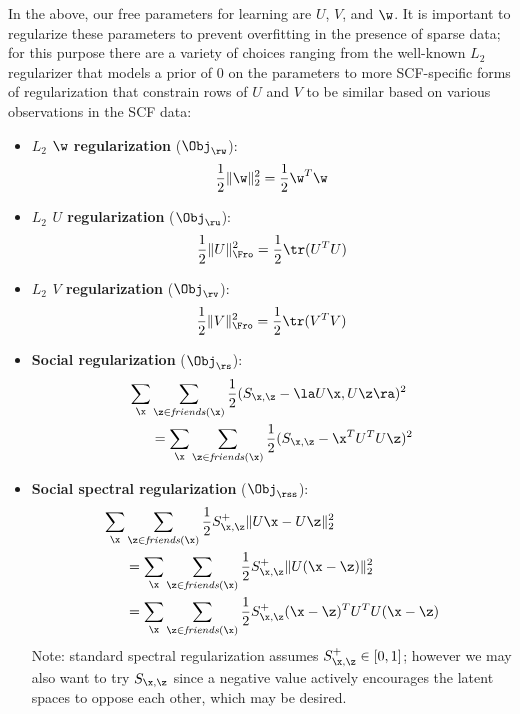 In the above, our free parameters for learning are $U$, $V$, and $\w$.
It is important to regularize these parameters to prevent overfitting in
the presence of sparse data;
for this purpose there are a variety of choices ranging from the well-known
$L_2$ regularizer that models a prior of $0$ on the parameters
to more SCF-specific forms of regularization that
constrain rows of $U$ and $V$ to be similar based on various observations
in the SCF data:
\begin{itemize}
\item {\bf $L_2$ $\w$ regularization} ($\Obj_\rw$):
\begin{align}
\frac{1}{2} \| \w \|_2^2 = \frac{1}{2} \w^T \w
\end{align}
\item {\bf $L_2$ $U$ regularization} ($\Obj_\ru$):
\begin{align}
\frac{1}{2} \| U \|_\Fro^2 = \frac{1}{2} \tr(U^T U)
\end{align}
\item {\bf $L_2$ $V$ regularization} ($\Obj_\rv$):
\begin{align}
\frac{1}{2} \| V \|_\Fro^2 = \frac{1}{2} \tr(V^T V)
\end{align}
\item {\bf Social regularization} ($\Obj_\rs$):
\begin{align}
\sum_{\x} & \sum_{\z \in \mathit{friends}(\x)} \frac{1}{2} (S_{\x,\z} - \la U\x, U\z \ra)^2 \nonumber \\
& = \sum_{\x} \sum_{\z \in \mathit{friends}(\x)} \frac{1}{2} (S_{\x,\z} - \x^T U^T U \z)^2
\end{align}
\item {\bf Social spectral regularization} ($\Obj_\rss$):
\begin{align}
\sum_{\x} & \sum_{\z \in \mathit{friends}(\x)} \frac{1}{2} S^+_{\x,\z} \| U\x - U\z \|_2^2 \nonumber \\
& = \sum_{\x} \sum_{\z \in \mathit{friends}(\x)} \frac{1}{2} S^+_{\x,\z} \| U (\x - \z) \|_2^2 \nonumber \\
& = \sum_{\x} \sum_{\z \in \mathit{friends}(\x)} \frac{1}{2} S^+_{\x,\z} (\x - \z)^T U^T U (\x - \z)
\end{align}
\subfive Note: standard spectral regularization assumes $S^+_{\x,\z} \in [0,1]$;
however we may also want to try $S_{\x,\z}$ since a negative value actively
encourages the latent spaces to oppose each other, which may be desired.
\end{itemize}

